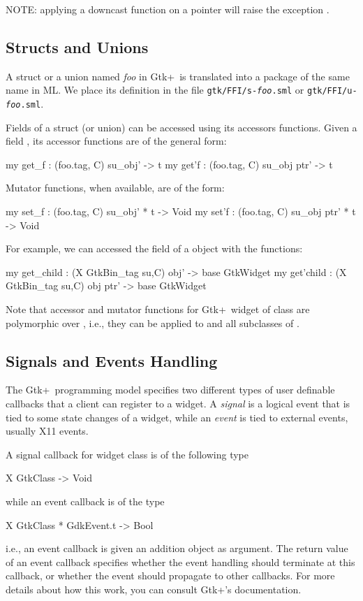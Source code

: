 \documentclass{article}
\newcommand{\gtk}{\mbox{\sf Gtk+}}
\begin{document}
   NOTE: applying a downcast function on a  pointer 
   will raise the exception .

\subsection{Structs and Unions}
      A struct or a union 
named {\em foo} in \gtk\ is translated into a package
of the same name in ML.   We place its definition in the
file {\tt gtk/FFI/s-{\em foo}.sml} or {\tt gtk/FFI/u-{\em foo}.sml}.

    Fields of a struct (or union) can be accessed using its
accessors functions.  Given a field , its accessor functions
are of the general form:
\begin{smldisp}
   my get_f : (foo.tag, C) su_obj' -> t
   my get'f : (foo.tag, C) su_obj ptr' -> t
\end{smldisp}

   Mutator functions, when available, are of the form:
\begin{smldisp}
   my set_f : (foo.tag, C) su_obj' * t -> Void
   my set'f : (foo.tag, C) su_obj ptr' * t -> Void
\end{smldisp}


For example, we can accessed the 
 field of a  object 
with the functions: 
\begin{smldisp}
   my get_child : (X GtkBin_tag su,C) obj' -> base GtkWidget 
   my get'child : (X GtkBin_tag su,C) obj ptr' -> base GtkWidget 
\end{smldisp}

Note that accessor and mutator functions for \gtk\ widget of class 
are polymorphic over , i.e., 
they can be applied to  and all subclasses of 
. 

\subsection{Signals and Events Handling}

   The \gtk\ programming model specifies two different types of user
definable callbacks that a client can register to a widget.  
A {\em signal} is a logical event that is tied to some state 
changes of a widget, while
an {\em event} is tied to external events, usually X11 events.  

   A signal callback for widget class  is of the following type
\begin{smldisp}
   X GtkClass -> Void
\end{smldisp}
\noindent while an event callback is of the type
\begin{smldisp}
   X GtkClass * GdkEvent.t -> Bool
\end{smldisp}
\indent i.e., an event callback is given an addition  object as
argument.   The return value of an event callback specifies whether
the event handling should terminate at this callback, or whether
the event should propagate to other callbacks.  For more
details about how this work, you can consult \gtk's
documentation.
\end{document}
